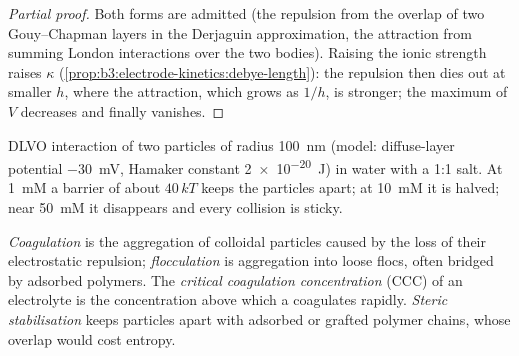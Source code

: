 \begin{proof}[Partial proof]
Both forms are admitted (the repulsion from the overlap of two Gouy--Chapman
layers in the Derjaguin approximation, the attraction from summing London
interactions over the two bodies). Raising the ionic strength raises $\kappa$
(\cref{prop:b3:electrode-kinetics:debye-length}): the repulsion then dies out at
smaller $h$, where the attraction, which grows as $1/h$, is stronger; the maximum
of $V$ decreases and finally vanishes.
\end{proof}

\begin{omfigure}

{\small DLVO interaction of two particles of radius \qty{100}{nm} (model: diffuse-layer
potential \qty{-30}{mV}, Hamaker constant \qty{2e-20}{J}) in water with a 1:1 salt. At \qty{1}{mM}
a barrier of about $40\,kT$ keeps the particles apart; at \qty{10}{mM} it is halved;
near \qty{50}{mM} it disappears and every collision is sticky.}
\end{omfigure}

\begin{definition}\label{def:b3:colloids:stability}
\emph{Coagulation} is the aggregation of colloidal particles
caused by the loss of their electrostatic repulsion; \emph{flocculation}
is aggregation into loose flocs, often bridged by adsorbed polymers. The
\emph{critical coagulation concentration}
(CCC) of an electrolyte is the concentration above which a
 coagulates rapidly. \emph{Steric stabilisation}
keeps particles apart with adsorbed or grafted polymer chains,
whose overlap would cost entropy.
\end{definition}

